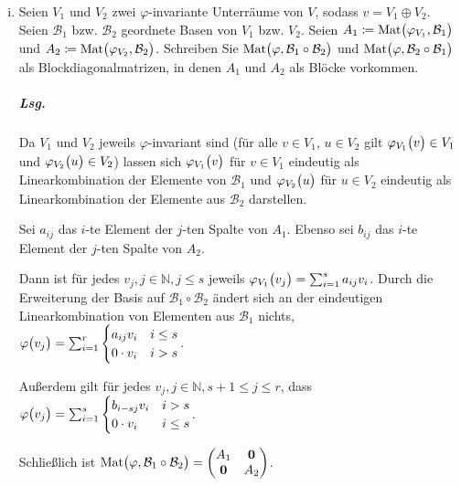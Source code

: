\documentclass{scrreprt}
\newcommand\Mat{\text{Mat}}
\begin{document}
\begin{enumerate}[(i)]
\item Seien $V_1$ und $V_2$ zwei $\varphi$-invariante Unterräume von $V$,
  sodass $v = V_1 \oplus V_2$.
  Seien $\mathcal{B}_1$ bzw. $\mathcal{B}_2$ geordnete Basen von $V_1$ bzw.
  $V_2$.
  Seien $A_1 \coloneqq \Mat\qty\big(\varphi_{V_1}, \mathcal{B}_1)$ und
  $A_2 \coloneqq \Mat\qty\big(\varphi_{V_2}, \mathcal{B}_2)$.
  Schreiben Sie $\Mat\qty\big(\varphi, \mathcal{B}_1 \circ \mathcal{B}_2)$ und
  $\Mat\qty\big(\varphi, \mathcal{B}_2 \circ \mathcal{B}_1)$ als
  Blockdiagonalmatrizen, in denen $A_1$ und $A_2$ als Blöcke vorkommen.

  \subparagraph{Lsg.}
  Da $V_1$ und $V_2$ jeweils $\varphi$-invariant sind (für alle $v \in V_1$,
  $u \in V_2$ gilt ${\varphi_{V_1}\qty\big(v) \in V_1}$ und
  $\varphi_{V_2}\qty\big(u) \in V_2$) lassen sich
  $\varphi_{V_1}\qty\big(v)$ für $v \in V_1$ eindeutig als Linearkombination der
  Elemente von $\mathcal{B}_1$ und $\varphi_{V_2}\qty\big(u)$ für $u \in V_2$
  eindeutig als Linearkombination der Elemente aus $\mathcal{B}_2$ darstellen.

  Sei $a_{ij}$ das $i$-te Element der $j$-ten Spalte von
  $A_1$.
  Ebenso sei $b_{ij}$ das $i$-te Element der $j$-ten Spalte von $A_2$.

  Dann ist für jedes $v_j, j \in \mathbb{N}, j \leq s$ jeweils
  $\varphi_{V_1}\qty\big(v_j) = \sum_{i = 1}^s a_{ij}v_i$.
  Durch die Erweiterung der Basis auf $\mathcal{B}_1 \circ \mathcal{B}_2$
  ändert sich an der eindeutigen Linearkombination von Elementen aus
  $\mathcal{B}_1$ nichts,
  $\varphi\qty\big(v_j) = \sum_{i = 1}^r \begin{cases}
    a_{ij}v_i & i \leq s \\
    0 \cdot v_i & i > s\\
  \end{cases}$.

  Außerdem gilt für jedes $v_j, j \in \mathbb{N}, s + 1 \leq j \leq r$, dass
  $\varphi\qty\big(v_j) = \sum_{i = 1}^s \begin{cases}
    b_{i - sj}v_i & i > s \\
    0 \cdot v_i & i \leq s
  \end{cases}$.

  Schließlich ist
  $\Mat\qty\big(\varphi, \mathcal{B}_1 \circ \mathcal{B}_2) = \begin{pmatrix}
    A_1 & \textbf{0} \\
    \textbf{0} & A_2 \\
  \end{pmatrix}$.


\end{enumerate}
\end{document}
